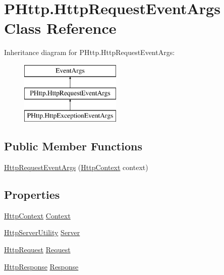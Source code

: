 \hypertarget{class_p_http_1_1_http_request_event_args}{}\section{P\+Http.\+Http\+Request\+Event\+Args Class Reference}
\label{class_p_http_1_1_http_request_event_args}
Inheritance diagram for P\+Http.\+Http\+Request\+Event\+Args\+:\begin{figure}[H]
\begin{center}
\leavevmode
\includegraphics[height=3.000000cm]{class_p_http_1_1_http_request_event_args}
\end{center}
\end{figure}
\subsection*{Public Member Functions}
\begin{DoxyCompactItemize}
\item 
\hyperlink{class_p_http_1_1_http_request_event_args_aab4d9a817dec66911fa8f3e70d691ac6}{Http\+Request\+Event\+Args} (\hyperlink{class_p_http_1_1_http_context}{Http\+Context} context)
\end{DoxyCompactItemize}
\subsection*{Properties}
\begin{DoxyCompactItemize}
\item 
\hyperlink{class_p_http_1_1_http_context}{Http\+Context} \hyperlink{class_p_http_1_1_http_request_event_args_a9fed5e43ed1cac4ed7e001c68df740bb}{Context}
\item 
\hyperlink{class_p_http_1_1_http_server_utility}{Http\+Server\+Utility} \hyperlink{class_p_http_1_1_http_request_event_args_a88b017f2e0e1078586498f4ce1ad8a0e}{Server}
\item 
\hyperlink{class_p_http_1_1_http_request}{Http\+Request} \hyperlink{class_p_http_1_1_http_request_event_args_a4a094461cfb830e14d22d6ffc0329bae}{Request}
\item 
\hyperlink{class_p_http_1_1_http_response}{Http\+Response} \hyperlink{class_p_http_1_1_http_request_event_args_a1d0c3f3d9aa610a2875b72f345379561}{Response}
\end{DoxyCompactItemize}


